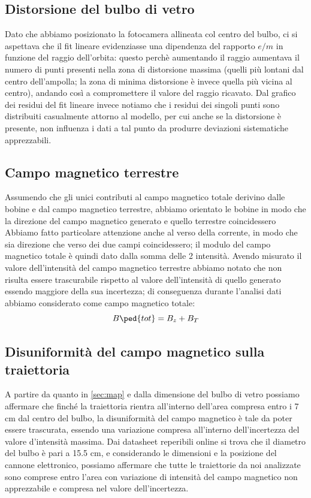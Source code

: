 \documentclass[10pt, a4paper, italian]{article}
\begin{document}
\subsection{Distorsione del bulbo di vetro}
Dato che abbiamo posizionato la fotocamera allineata col centro del bulbo, ci si aspettava che il fit lineare evidenziasse una dipendenza del rapporto $e/m$ in funzione del raggio dell'orbita: questo perchè aumentando il raggio aumentava il numero di punti presenti nella zona di distorsione massima (quelli più lontani dal centro dell'ampolla; la zona di minima distorsione è invece quella più vicina al centro), andando così a compromettere il valore del raggio ricavato.
Dal grafico dei residui del fit lineare invece notiamo che i residui dei singoli punti sono distribuiti casualmente attorno al modello, per cui anche se la distorsione è presente, non influenza i dati a tal punto da produrre deviazioni sistematiche apprezzabili.

\subsection{Campo magnetico terrestre}
Assumendo che gli unici contributi al campo magnetico totale derivino dalle bobine e dal campo magnetico terrestre, abbiamo orientato le bobine in modo che la direzione del campo magnetico generato e quello terrestre coincidessero
Abbiamo fatto particolare attenzione anche al verso della corrente, in modo che sia direzione che verso dei due campi coincidessero; il modulo del campo magnetico totale è quindi dato dalla somma delle 2 intensità.
Avendo misurato il valore dell'intensità del campo magnetico terrestre abbiamo notato che non risulta essere trascurabile rispetto al valore dell'intensità di quello generato essendo maggiore della sua incertezza; di conseguenza durante l'analisi dati abbiamo considerato come campo magnetico totale:
\[
B\ped{tot} = B_z + B_T
\]

\subsection{Disuniformità del campo magnetico sulla traiettoria}
A partire da quanto in \ref{sec:map} e dalla dimensione del bulbo di vetro possiamo affermare che finché la traiettoria rientra all'interno dell'area compresa entro i 7 cm dal centro del bulbo, la disuniformità del campo magnetico è tale da poter essere trascurata, essendo una variazione compresa all'interno dell'incertezza del valore d'intensità massima.
Dai datasheet reperibili online si trova che il diametro del bulbo è pari a 15.5 cm, e considerando le dimensioni e la posizione del cannone elettronico, possiamo affermare che tutte le traiettorie da noi analizzate sono comprese entro l'area con variazione di intensità del campo magnetico non apprezzabile e compresa nel valore dell'incertezza.
\end{document}
